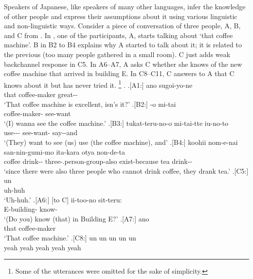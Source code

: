 Speakers of Japanese, like speakers of many other languages,
infer the knowledge of other people and
express their assumptions about it using various linguistic and non-linguistic ways.
Consider a piece of conversation of three people, A, B, and C
from  \cite{Den_2007_SAC}.
In \Next[-A1],
one of the participants, A, starts talking about  `that coffee machine'.
B in B2 to B4 explains why A started to talk about it;
it is related to the previous  (too many people gathered in a small room).
C just adds weak backchannel response in C5.
In A6--A7,
A asks C whether she knows of the new coffee machine that arrived in building E.
In C8--C11,
C answers to A that
C knows about it but has never tried it.%
	\footnote{
	Some of the utterances were omitted for the sake of simplicity.
	}
%
\ex.
 \ag.[A1:] ano  sugoi-yo-ne \\
      that coffee-maker great-- \\
      `That coffee machine is excellent, isn's it?'
 \bg.[B2:] -o mi-tai \\
          coffee-maker- see-want \\
          `(I) wanna see the coffee machine.'
 \bg.[B3:] tukat-teru-no-o mi-tai-tte iu-no-to \\
           use--- see-want- say--and \\
           `(They) want to see (us) use (the coffee machine), and'
 \bg.[B4:] koohii nom-e-nai san-nin-gumi-mo ita-kara otya non-de-ta \\
           coffee drink-- three-.person-group-also exist-because tea drink-- \\
           `since there were also three people who cannot drink coffee, they drank tea.'
 \bg.[C5:] un \\
           uh-huh \\
           `Uh-huh.'
 \bg.[A6:] [to C] ii-too-no sit-teru: \\
           {} {} E-building- know- \\
           `(Do you) know (that) in Building E?'
 \bg.[A7:] ano  \\
           that coffee-maker \\
           `That coffee machine.'
 \bg.[C8:] un un un un un \\
           yeah yeah yeah yeah yeah \\
